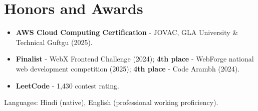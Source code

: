 \documentclass[11pt,a4paper,sans]{moderncv}
\begin{document}

\section{Honors and Awards}
\vspace{1pt}
\begin{itemize}
    \item {\textbf{AWS Cloud Computing Certification} - JOVAC, GLA University \& Technical Guftgu (2025).}
    \item {\textbf{Finalist} - WebX Frontend Challenge (2024); \textbf{4th place} - WebForge national web development competition (2025); \textbf{4th place} - Code Arambh (2024).}
    \item {\textbf{LeetCode} - 1,430 contest rating.}
\end{itemize}


\vspace{2pt}
\small{Languages: Hindi (native), English (professional working proficiency).}
\end{document}
